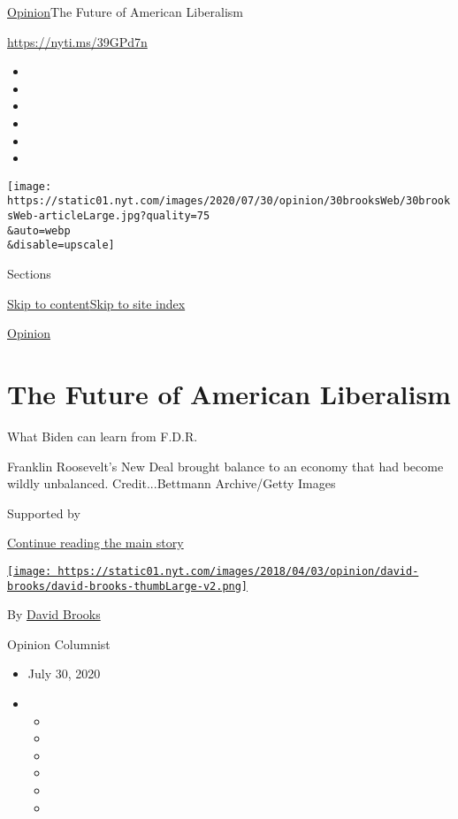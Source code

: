\href{/section/opinion}{Opinion}\textbar{}The Future of American
Liberalism

\href{https://nyti.ms/39GPd7n}{https://nyti.ms/39GPd7n}

\begin{itemize}
\item
\item
\item
\item
\item
\item
\end{itemize}

\texttt{[image: https://static01.nyt.com/images/2020/07/30/opinion/30brooksWeb/30brooksWeb-articleLarge.jpg?quality=75\\\&auto=webp\\\&disable=upscale]}

Sections

\protect\hyperlink{site-content}{Skip to
content}\protect\hyperlink{site-index}{Skip to site index}

\href{/section/opinion}{Opinion}

\hypertarget{the-future-of-american-liberalism}{%
\section{The Future of American
Liberalism}\label{the-future-of-american-liberalism}}

What Biden can learn from F.D.R.

Franklin Roosevelt's New Deal brought balance to an economy that had
become wildly unbalanced. Credit...Bettmann Archive/Getty Images

Supported by

\protect\hyperlink{after-sponsor}{Continue reading the main story}

\href{https://www.nytimes.com/by/david-brooks}{\texttt{[image: https://static01.nyt.com/images/2018/04/03/opinion/david-brooks/david-brooks-thumbLarge-v2.png]}}

By \href{https://www.nytimes.com/by/david-brooks}{David Brooks}

Opinion Columnist

\begin{itemize}
\item
  July 30, 2020
\item
  \begin{itemize}
  \item
  \item
  \item
  \item
  \item
  \item
  \end{itemize}
\end{itemize}

